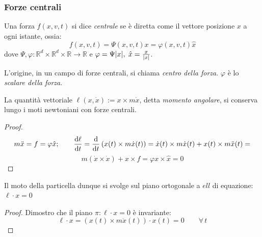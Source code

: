 \subsubsection{Forze centrali}

\begin{definition}
    Una forza $f(x,v,t)$ si dice \textit{centrale} se è diretta come il vettore posizione $x$ a ogni istante, ossia:
    \begin{equation}
        f(x,v,t)= \Psi(x,v,t)x= \varphi(x,v,t)\hat{x}
    \end{equation}
    dove $\Psi,\varphi: \mathbb{R}^d\times \mathbb{R}^d \times \mathbb{R} \rightarrow \mathbb{R}$ e $\varphi=\Psi\abs{x}, \;\hat{x}=\frac{x}{\abs{x}}$.
\end{definition}

\begin{definition}
    L'origine, in un campo di forze centrali, si chiama \textit{centro della forza}. $\varphi$ è lo \textit{scalare della forza}.
\end{definition}

\begin{proposition}
    La quantità vettoriale $\ell(x,\dot{x}):= x\times m\dot{x}$, detta \textit{momento angolare}, si conserva lungo i moti newtoniani con forze centrali.
\end{proposition}
\begin{proof}
    \begin{equation*}
        m\ddot{x}= f= \varphi\hat{x};  \qquad \dv{\ell}{t}= \dv{t}\left( x(t)\times m\dot{x}(t)\right)= 
        \dot{x}(t)\times m\dot{x}(t)+ x(t)\times m\ddot{x}(t)=
    \end{equation*}
    \begin{equation}
        m(\dot{x}\times\dot{x})+x\times f= \varphi x \times \hat{x}=0
    \end{equation}
\end{proof}

\begin{proposition}
    Il moto della particella dunque si svolge sul piano ortogonale a $ell$ di equazione: $\ell\cdot x =0$
\end{proposition}
\begin{proof}
    Dimostro che il piano $\pi:\ell\cdot x=0$ è invariante:
    \begin{equation}
        \ell\cdot x= (x(t)\times m\dot{x}(t))\cdot x(t)=0 \qquad\forall \, t
    \end{equation}
\end{proof}

